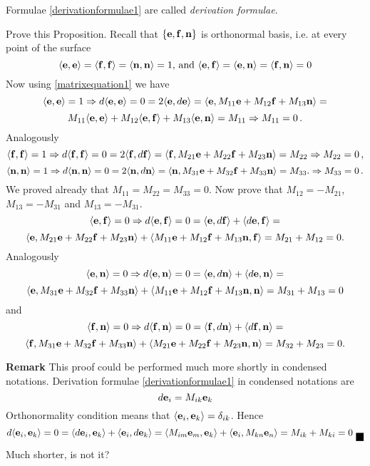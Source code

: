 \documentclass[12pt]{article}
\theoremstyle{theorem}
\numberwithin{equation}{section}
\begin{document}
{ \m
Formulae \eqref{derivationformulae1} are called {\it derivation formulae}.


 Prove this Proposition. Recall that $\{{\bf e},{\bf f},{\bf n}\}$ is orthonormal basis, i.e. at every point of the surface
                  $$
  \langle{\bf e},{\bf e}\rangle=\langle{\bf f},{\bf f}\rangle=\langle{\bf n},{\bf n}\rangle=1, \,{\rm and}\,\,
   \langle{\bf e},{\bf f}\rangle=\langle{\bf e},{\bf n}\rangle=\langle{\bf f},{\bf n}\rangle=0
         $$
 Now using \eqref{matrixequation1} we have
         $$
  \langle{\bf e},{\bf e}\rangle=1\Rightarrow d\langle{\bf e},{\bf e}\rangle=0=2\langle{\bf e},d{\bf e}\rangle
  =\langle{\bf e},M_{11}{\bf e}+M_{12}{\bf f}+M_{13}{\bf n}\rangle=
               $$
               $$
               M_{11}\langle{\bf e},{\bf e}\rangle+M_{12}\langle{\bf e},{\bf f}\rangle+
  M_{13}\langle{\bf e},{\bf n}\rangle=M_{11}\Rightarrow M_{11}=0\,.
              $$
 Analogously
           $$
     \langle{\bf f},{\bf f}\rangle=1\Rightarrow d\langle{\bf f},{\bf f}\rangle=0=2\langle{\bf f},d{\bf f}\rangle
  =\langle{\bf f},M_{21}{\bf e}+M_{22}{\bf f}+M_{23}{\bf n}\rangle=M_{22}\Rightarrow M_{22}=0\,,
           $$
            $$
             \langle{\bf n},{\bf n}\rangle=1\Rightarrow d\langle{\bf n},{\bf n}\rangle=0=2\langle{\bf n},d{\bf n}\rangle
  =\langle{\bf n},M_{31}{\bf e}+M_{32}{\bf f}+M_{33}{\bf n}\rangle=M_{33}. \Rightarrow M_{33}=0\,.
            $$
 We proved already that $M_{11}=M_{22}=M_{33}=0$. Now prove that
 $M_{12}=-M_{21}$, $M_{13}=-M_{31}$ and $M_{13}=-M_{31}$.
                       $$
  \langle{\bf e},{\bf f}\rangle=0\Rightarrow d\langle{\bf e},{\bf f}\rangle=0=\langle{\bf e},d{\bf f}\rangle+\langle d{\bf e},{\bf f}\rangle=
             $$
             $$
  \langle{\bf e},M_{21}{\bf e}+M_{22}{\bf f}+M_{23}{\bf n}\rangle+\langle M_{11}{\bf e}+M_{12}{\bf f}+M_{13}{\bf n},{\bf f}\rangle=
  M_{21}+M_{12}=0.
          $$
 Analogously
       $$
       \langle{\bf e},{\bf n}\rangle=0\Rightarrow d\langle{\bf e},{\bf n}\rangle=0=\langle{\bf e},d{\bf n}\rangle+\langle d{\bf e},{\bf n}\rangle=
             $$
             $$
  \langle{\bf e},M_{31}{\bf e}+M_{32}{\bf f}+M_{33}{\bf n}\rangle+\langle M_{11}{\bf e}+M_{12}{\bf f}+M_{13}{\bf n},{\bf n}\rangle=
  M_{31}+M_{13}=0
       $$
 and
          $$
          \langle{\bf f},{\bf n}\rangle=0\Rightarrow d\langle{\bf f},{\bf n}\rangle=0=\langle{\bf f},d{\bf n}\rangle+\langle d{\bf f},{\bf n}\rangle=
             $$
             $$
  \langle{\bf f},M_{31}{\bf e}+M_{32}{\bf f}+M_{33}{\bf n}\rangle+\langle M_{21}{\bf e}+M_{22}{\bf f}+M_{23}{\bf n},{\bf n}\rangle=
  M_{32}+M_{23}=0.
          $$

       {\bf Remark} This proof could be performed much more shortly in condensed notations. Derivation formulae
       \eqref{derivationformulae1} in condensed notations are
          \begin{equation}\label{derivationcondensed}
          d{\bf e}_i=M_{ik}{\bf e}_k
          \end{equation}
     Orthonormality condition means that $\langle{\bf e}_i,{\bf e}_k\rangle=\delta_{ik}$. Hence
        \begin{equation}
   d\langle\e_i,\e_k\rangle=0=\langle d\e_i,\e_k\rangle+\langle\e_i,d\e_k\rangle=
   \langle  M_{im}\e_m,\e_k\rangle+\langle\e_i,M_{kn}\e_n\rangle=M_{ik}+M_{ki}=0\hbox{\finish}
        \end{equation}
    Much shorter, is not it?


}
\end{document}
